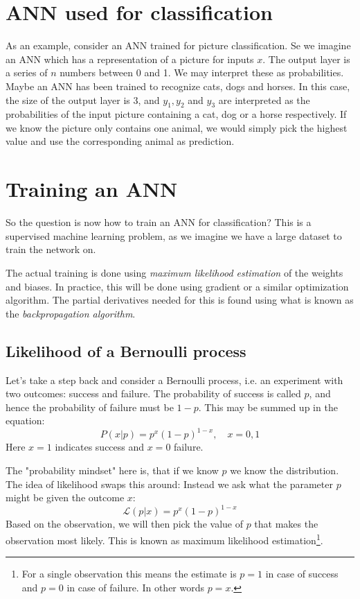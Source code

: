 \documentclass[12pt, a4paper]{article}
\numberwithin{equation}{section}
\begin{document}
\section{ANN used for classification}
As an example, consider an ANN trained for picture classification. Se we imagine an ANN which has a representation of a picture for inputs $x$. The output layer is a series of $n$ numbers between 0 and 1. We may interpret these as probabilities. Maybe an ANN has been trained to recognize cats, dogs and horses. In this case, the size of the output layer is 3, and $y_1, y_2$ and $y_3$ are interpreted as the probabilities of the input picture containing a cat, dog or a horse respectively. If we know the picture only contains one animal, we would simply pick the highest value and use the corresponding animal as prediction.

\section{Training an ANN}
So the question is now how to train an ANN for classification? This is a supervised machine learning problem, as we imagine we have a large dataset to train the network on.

The actual training is done using \textit{maximum likelihood estimation} of the weights and biases. In practice, this will be done using gradient or a similar optimization algorithm. The partial derivatives needed for this is found using what is known as the \textit{backpropagation algorithm}.

\subsection{Likelihood of a Bernoulli process}
Let's take a step back and consider a Bernoulli process, i.e. an experiment with two outcomes: success and failure. The probability of success is called $p$, and hence the probability of failure must be $1-p$. This may be summed up in the equation:
\begin{equation}
P(x|p)=p^x(1-p)^{1-x},\quad x=0,1
\end{equation}
Here $x=1$ indicates success and $x=0$ failure.

The "probability mindset" here is, that if we know $p$ we know the distribution. The idea of likelihood swaps this around: Instead we ask what the parameter $p$ might be given the outcome $x$:
\begin{equation}
\mathcal{L}(p|x)=p^x(1-p)^{1-x}
\end{equation}
Based on the observation, we will then pick the value of $p$ that makes the observation most likely. This is known as maximum likelihood estimation\footnote{For a single observation this means the estimate is $p=1$ in case of success and $p=0$ in case of failure. In other words $p=x$.}.
\end{document}
